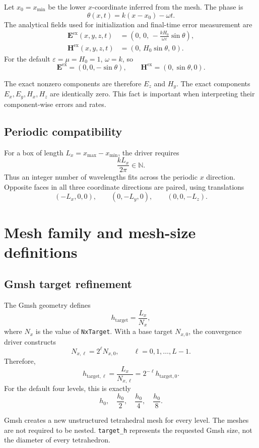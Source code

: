 \documentclass[11pt]{article}
\newcommand{\vect}[1]{\boldsymbol{#1}}
\newcommand{\code}[1]{\nolinkurl{#1}}
\newcommand{\Eex}{\vect E^{\mathrm{ex}}}
\newcommand{\Hex}{\vect H^{\mathrm{ex}}}
\begin{document}
Let \(x_0=x_{\min}\) be the lower \(x\)-coordinate inferred from the mesh.
The phase is
\[
  \theta(x,t)=k(x-x_0)-\omega t.
\]
The analytical fields used for initialization and final-time error
measurement are
\begin{align}
  \Eex(x,y,z,t)
    &=
    \left(
      0,\,
      0,\,
      -\frac{kH_0}{\omega\varepsilon}\sin\theta
    \right),
  \\
  \Hex(x,y,z,t)
    &=
    \left(
      0,\,
      H_0\sin\theta,\,
      0
    \right).
\end{align}
For the default \(\varepsilon=\mu=H_0=1\), \(\omega=k\), so
\[
  \Eex=(0,0,-\sin\theta),
  \qquad
  \Hex=(0,\sin\theta,0).
\]

The exact nonzero components are therefore \(E_z\) and \(H_y\). The exact
components \(E_x,E_y,H_x,H_z\) are identically zero. This fact is important
when interpreting their component-wise errors and rates.

\subsection{Periodic compatibility}

For a box of length \(L_x=x_{\max}-x_{\min}\), the driver requires
\[
  \frac{kL_x}{2\pi}\in\mathbb{N}.
\]
Thus an integer number of wavelengths fits across the periodic \(x\)
direction. Opposite faces in all three coordinate directions are paired,
using translations
\[
  (-L_x,0,0),\qquad
  (0,-L_y,0),\qquad
  (0,0,-L_z).
\]

\section{Mesh family and mesh-size definitions}

\subsection{Gmsh target refinement}

The Gmsh geometry defines
\[
  h_{\mathrm{target}}=\frac{L_x}{N_x},
\]
where \(N_x\) is the value of \code{NxTarget}. With a base target
\(N_{x,0}\), the convergence driver constructs
\[
  N_{x,\ell}=2^\ell N_{x,0},
  \qquad \ell=0,1,\ldots,L-1.
\]
Therefore,
\[
  h_{\mathrm{target},\ell}
    =\frac{L_x}{N_{x,\ell}}
    =2^{-\ell}h_{\mathrm{target},0}.
\]
For the default four levels, this is exactly
\[
  h_0,\quad \frac{h_0}{2},\quad \frac{h_0}{4},\quad \frac{h_0}{8}.
\]

Gmsh creates a new unstructured tetrahedral mesh for every level. The meshes
are not required to be nested. \code{target_h} represents the requested
Gmsh size, not the diameter of every tetrahedron.
\end{document}
